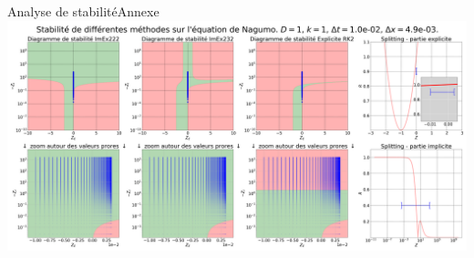 \begin{frame}{Analyse de stabilité}{Annexe}
    \includegraphics[width = \textwidth]{medias/2_/1_/STABILITE_D1_k1_dt1.0e-02_dx4.9e-03.png}
\end{frame}